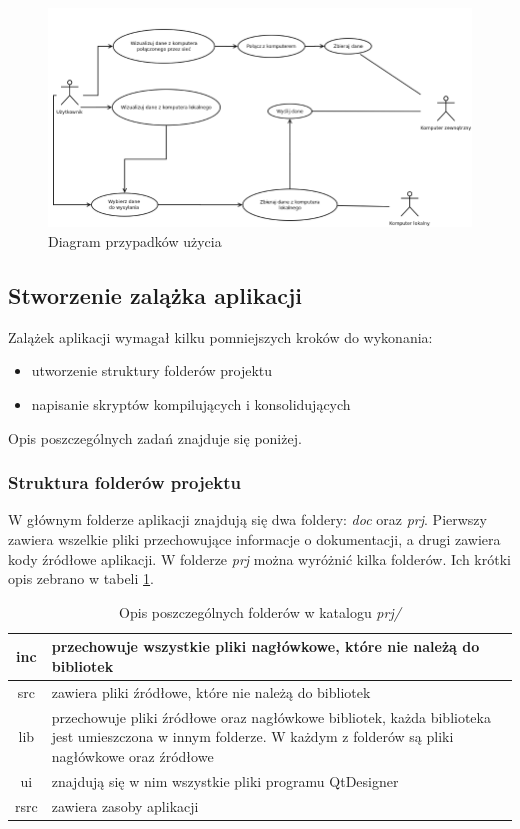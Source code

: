 \documentclass[a4paper]{article}
\begin{document}
\begin{figure}[h]
	\centering
	\includegraphics[width=0.75\paperheight, angle=90]{img/diagramPrzypadkowUzycia.png}
	\caption{Diagram przypadków użycia}
	\label{diagram_przypadkow_uzycia}
\end{figure}

\subsection{Stworzenie zalążka aplikacji}

Zalążek aplikacji wymagał kilku pomniejszych kroków do wykonania:
\begin{itemize}
	\item utworzenie struktury folderów projektu
	\item napisanie skryptów kompilujących i konsolidujących
\end{itemize}
Opis poszczególnych zadań znajduje się poniżej.

\subsubsection{Struktura folderów projektu}
W głównym folderze aplikacji znajdują się dwa foldery: \textit{doc} oraz \textit{prj}. Pierwszy zawiera wszelkie pliki przechowujące informacje o dokumentacji, a drugi zawiera kody źródłowe aplikacji. W folderze \textit{prj} można wyróżnić kilka folderów. Ich krótki opis zebrano w tabeli \ref{opis_folderow_prj}.

\begin{table}
\centering
\begin{tabularx}{0.7\linewidth}{|c|X|}
	\hline
	inc & przechowuje wszystkie pliki nagłówkowe, które nie należą do bibliotek \\ \hline
	src & zawiera pliki źródłowe, które nie należą do bibliotek \\ \hline
	lib & przechowuje pliki źródłowe oraz nagłówkowe bibliotek, każda biblioteka jest umieszczona 
		  w innym folderze. W każdym z folderów są pliki nagłówkowe oraz źródłowe \\ \hline
	ui & znajdują się w nim wszystkie pliki  programu QtDesigner \\ \hline
	rsrc  & zawiera zasoby aplikacji \\ \hline
\end{tabularx}
\caption{Opis poszczególnych folderów w katalogu \textit{prj/}}
\label{opis_folderow_prj}
\end{table}
\end{document}
